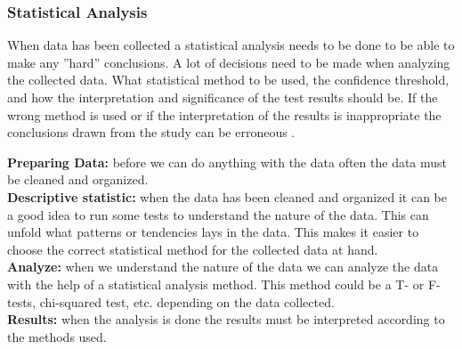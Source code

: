 \subsubsection{Statistical Analysis}%
\label{sub:Statistical analysis}
When data has been collected a statistical analysis needs to be done to be able to make any ''hard'' conclusions. A lot of decisions need to be made when analyzing the collected data. What statistical method to be used, the confidence threshold, and how the interpretation and significance of the test results should be. If the wrong method is used or if the interpretation of the results is inappropriate the conclusions drawn from the study can be erroneous \cite{lazar2017research}. 


\textbf{Preparing Data:} before we can do anything with the data often the data must be cleaned and organized.\\
\textbf{Descriptive statistic:} when the data has been cleaned and organized it can be a good idea to run some tests to understand the nature of the data. This can unfold what patterns or tendencies lays in the data. This makes it easier to choose the correct statistical method for the collected data at hand.\\
\textbf{Analyze:} when we understand the nature of the data we can analyze the data with the help of a statistical analysis method. This method could be a T- or F-tests, chi-squared test, etc. depending on the data collected.\\ 
\textbf{Results:} when the analysis is done the results must be interpreted according to the methods used.\\





